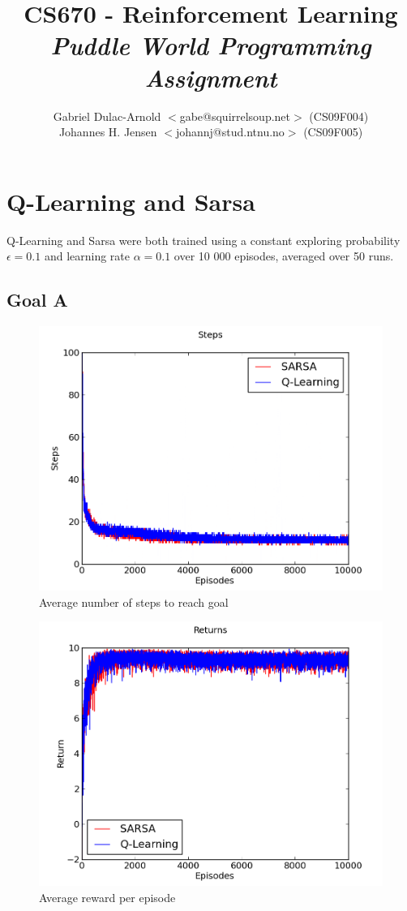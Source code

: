 \documentclass[a4paper]{article}
\author{Gabriel Dulac-Arnold $<$gabe@squirrelsoup.net$>$ (CS09F004) \\
Johannes H. Jensen $<$johannj@stud.ntnu.no$>$ (CS09F005)}
\title{CS670 - Reinforcement Learning \\
\emph{Puddle World Programming Assignment}}
\begin{document}
\setlength{\parskip}{2ex}
\maketitle

\section{Q-Learning and Sarsa}

Q-Learning and Sarsa were both trained using a constant exploring probability 
$\epsilon = 0.1$ and learning rate $\alpha = 0.1$ over 10 000 episodes, averaged
over 50 runs.

\subsection{Goal A}

\begin{figure}[htbp!]
\center
\includegraphics[scale=0.75]{A/steps.png}
\caption{Average number of steps to reach goal}
\end{figure}

\begin{figure}[htbp!]
\center
\includegraphics[scale=0.75]{A/returns.png}
\caption{Average reward per episode}
\end{figure}
\end{document}
